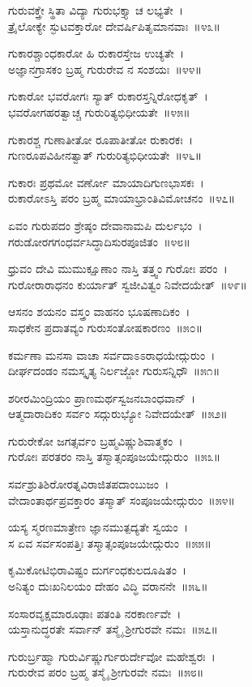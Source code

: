 ಗುರುವಕ್ತ್ರೇ ಸ್ಥಿತಾ ವಿದ್ಯಾ ಗುರುಭಕ್ತ್ಯಾ ಚ ಲಭ್ಯತೇ~।\\
ತ್ರೈಲೋಕ್ಯೇ ಸ್ಫುಟವಕ್ತಾರೋ ದೇವರ್ಷಿಪಿತೃಮಾನವಾಃ~॥೪೩॥

ಗುಕಾರಶ್ಚಾಂಧಕಾರೋ ಹಿ ರುಕಾರಸ್ತೇಜ ಉಚ್ಯತೇ~।\\
ಅಜ್ಞಾನಗ್ರಾಸಕಂ ಬ್ರಹ್ಮ ಗುರುರೇವ ನ ಸಂಶಯಃ~॥೪೪॥

ಗುಕಾರೋ ಭವರೋಗಃ ಸ್ಯಾತ್ ರುಕಾರಸ್ತನ್ನಿರೋಧಕೃತ್~।\\
ಭವರೋಗಹರತ್ವಾಚ್ಚ ಗುರುರಿತ್ಯಭಿಧೀಯತೇ~॥೪೫॥

ಗುಕಾರಶ್ಚ ಗುಣಾತೀತೋ ರೂಪಾತೀತೋ ರುಕಾರಕಃ~।\\
ಗುಣರೂಪವಿಹೀನತ್ವಾತ್ ಗುರುರಿತ್ಯಭಿಧೀಯತೇ~॥೪೬॥

ಗುಕಾರಃ ಪ್ರಥಮೋ ವರ್ಣೋ ಮಾಯಾದಿಗುಣಭಾಸಕಃ~।\\
ರುಕಾರೋಽಸ್ತಿ ಪರಂ ಬ್ರಹ್ಮ ಮಾಯಾಭ್ರಾಂತಿವಿಮೋಚನಂ~॥೪೭॥

ಏವಂ ಗುರುಪದಂ ಶ್ರೇಷ್ಠಂ ದೇವಾನಾಮಪಿ ದುರ್ಲಭಂ~।\\
ಗರುಡೋರಗಗಂಧರ್ವಸಿದ್ಧಾದಿಸುರಪೂಜಿತಂ~॥೪೮॥

ಧ್ರುವಂ ದೇವಿ ಮುಮುಕ್ಷೂಣಾಂ ನಾಸ್ತಿ ತತ್ತ್ವಂ ಗುರೋಃ ಪರಂ~।\\
ಗುರೋರಾರಾಧನಂ ಕುರ್ಯಾತ್ ಸ್ವಜೀವಿತ್ವಂ ನಿವೇದಯೇತ್~॥೪೯॥

ಆಸನಂ ಶಯನಂ ವಸ್ತ್ರಂ ವಾಹನಂ ಭೂಷಣಾದಿಕಂ~।\\
ಸಾಧಕೇನ ಪ್ರದಾತವ್ಯಂ ಗುರುಸಂತೋಷಕಾರಣಂ~॥೫೦॥

ಕರ್ಮಣಾ ಮನಸಾ ವಾಚಾ ಸರ್ವದಾಽಽರಾಧಯೇದ್ಗುರುಂ~।\\
ದೀರ್ಘದಂಡಂ ನಮಸ್ಕೃತ್ಯ ನಿರ್ಲಜ್ಜೋ ಗುರುಸನ್ನಿಧೌ~॥೫೧॥

ಶರೀರಮಿಂದ್ರಿಯಂ ಪ್ರಾಣಮರ್ಥಸ್ವಜನಬಾಂಧವಾನ್~।\\
ಆತ್ಮದಾರಾದಿಕಂ ಸರ್ವಂ ಸದ್ಗುರುಭ್ಯೋ ನಿವೇದಯೇತ್~॥೫೨॥

ಗುರುರೇಕೋ ಜಗತ್ಸರ್ವಂ ಬ್ರಹ್ಮವಿಷ್ಣುಶಿವಾತ್ಮಕಂ~।\\
ಗುರೋಃ ಪರತರಂ ನಾಸ್ತಿ ತಸ್ಮಾತ್ಸಂಪೂಜಯೇದ್ಗುರುಂ~॥೫೩॥

ಸರ್ವಶ್ರುತಿಶಿರೋರತ್ನವಿರಾಜಿತಪದಾಂಬುಜಂ~।\\
ವೇದಾಂತಾರ್ಥಪ್ರವಕ್ತಾರಂ ತಸ್ಮಾತ್ ಸಂಪೂಜಯೇದ್ಗುರುಂ~॥೫೪॥

ಯಸ್ಯ ಸ್ಮರಣಮಾತ್ರೇಣ ಜ್ಞಾನಮುತ್ಪದ್ಯತೇ ಸ್ವಯಂ~।\\
ಸ ಏವ ಸರ್ವಸಂಪತ್ತಿಃ ತಸ್ಮಾತ್ಸಂಪೂಜಯೇದ್ಗುರುಂ~॥೫೫॥

ಕೃಮಿಕೋಟಿಭಿರಾವಿಷ್ಟಂ ದುರ್ಗಂಧಕುಲದೂಷಿತಂ~।\\
ಅನಿತ್ಯಂ ದುಃಖನಿಲಯಂ ದೇಹಂ ವಿದ್ಧಿ ವರಾನನೇ~॥೫೬॥

ಸಂಸಾರವೃಕ್ಷಮಾರೂಢಾಃ ಪತಂತಿ ನರಕಾರ್ಣವೇ~।\\
ಯಸ್ತಾನುದ್ಧರತೇ ಸರ್ವಾನ್ ತಸ್ಮೈ ಶ್ರೀಗುರವೇ ನಮಃ~॥೫೭॥

ಗುರುರ್ಬ್ರಹ್ಮಾ ಗುರುರ್ವಿಷ್ಣುರ್ಗುರುರ್ದೇವೋ ಮಹೇಶ್ವರಃ~।\\
ಗುರುರೇವ ಪರಂ ಬ್ರಹ್ಮ ತಸ್ಮೈ ಶ್ರೀಗುರವೇ ನಮಃ~॥೫೮॥

